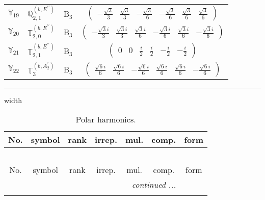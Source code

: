 \documentclass[fleqn,10pt,landscape]{article}
\begin{document}
\begin{itemize}
\begin{center}
\begin{longtable}{c|c|c|c}
$ \mathbb{Y}_{19} $ & $\mathbb{Q}_{2,1}^{(b,E^{\prime\prime})}$ & B$_{3}$ & $\begin{pmatrix} - \frac{\sqrt{3}}{3} & \frac{\sqrt{3}}{3} & - \frac{\sqrt{3}}{6} & - \frac{\sqrt{3}}{6} & \frac{\sqrt{3}}{6} & \frac{\sqrt{3}}{6} \end{pmatrix}$ \\
$ \mathbb{Y}_{20} $ & $\mathbb{T}_{2,0}^{(b,E^{\prime\prime})}$ & B$_{3}$ & $\begin{pmatrix} - \frac{\sqrt{3} i}{3} & \frac{\sqrt{3} i}{3} & \frac{\sqrt{3} i}{6} & - \frac{\sqrt{3} i}{6} & \frac{\sqrt{3} i}{6} & - \frac{\sqrt{3} i}{6} \end{pmatrix}$ \\
$ \mathbb{Y}_{21} $ & $\mathbb{T}_{2,1}^{(b,E^{\prime\prime})}$ & B$_{3}$ & $\begin{pmatrix} 0 & 0 & \frac{i}{2} & \frac{i}{2} & - \frac{i}{2} & - \frac{i}{2} \end{pmatrix}$ \\
$ \mathbb{Y}_{22} $ & $\mathbb{T}_{3}^{(b,A_{2}^{\prime})}$ & B$_{3}$ & $\begin{pmatrix} \frac{\sqrt{6} i}{6} & \frac{\sqrt{6} i}{6} & - \frac{\sqrt{6} i}{6} & \frac{\sqrt{6} i}{6} & \frac{\sqrt{6} i}{6} & - \frac{\sqrt{6} i}{6} \end{pmatrix}$ \\
\end{longtable}
\end{center}

 \hfil \hrule height 1mm width \textwidth \hfil

\begin{center}
\renewcommand{\arraystretch}{1.3}
\begin{longtable}{ccccccc}
\caption{Polar harmonics.}
 \\
 \hline \hline
No. & symbol & rank & irrep. & mul. & comp. & form \\ \hline \endfirsthead

\multicolumn{6}{l}{\tablename\ \thetable{}} \\
 \hline \hline
No. & symbol & rank & irrep. & mul. & comp. & form \\ \hline \endhead

 \hline \hline
\multicolumn{6}{r}{\footnotesize\it continued ...} \\ \endfoot


\end{longtable}
\end{center}
\end{itemize}
\end{document}
